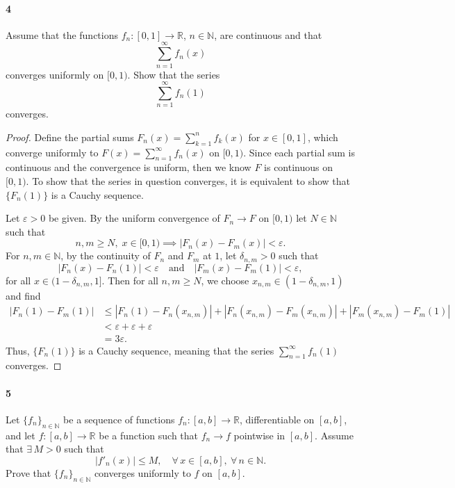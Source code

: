 \documentclass[12pt]{article}
\newenvironment{fullbox}{\begin{lrbox}{\savefullbox}\begin{minipage}{\dimexpr\textwidth-2\fboxsep\relax}}{\end{minipage}\end{lrbox}\begin{center}\framebox[\textwidth]{\usebox{\savefullbox}}\end{center}}
\newenvironment{pbox}[1][]{\begin{fullbox}\ifx#1\empty\else\paragraph{#1}\fi}{\end{fullbox}}
\theoremstyle{definition}
\newcommand{\isp}[1]{\quad\text{#1}\quad}
\newcommand{\N}{\mathbb{N}}
\newcommand{\R}{\mathbb{R}}
\newcommand{\eps}{\varepsilon}
\begin{document}
\newpage
\begin{pbox}[4]
    Assume that the functions $f_n:[0,1]\to \R$, $n\in \N$, are continuous and that 
    \begin{equation}
    \sum_{n=1}^\infty f_n(x)
    \end{equation}
    converges uniformly on $[0,1)$. Show that the series 
    \begin{equation}
    \sum_{n=1}^\infty f_n(1)
    \end{equation}
    converges.
\end{pbox}

\begin{proof}
    Define the partial sums $F_n(x) = \sum_{k=1}^{n} f_k(x)$ for $x \in [0, 1]$, which converge uniformly to $F(x) = \sum_{n=1}^{\infty} f_n(x)$ on $[0, 1)$. Since each partial sum is continuous and the convergence is uniform, then we know $F$ is continuous on $[0, 1)$. To show that the series in question converges, it is equivalent to show that $\{F_n(1)\}$ is a Cauchy sequence.
    
    Let $\eps > 0$ be given. By the uniform convergence of $F_n \to F$ on $[0, 1)$ let $N \in \N$ such that
    \[
        n, m \geq N,\; x \in [0, 1) \implies |F_n(x) - F_m(x)| < \eps.
    \]
    For $n, m \in \N$, by the continuity of $F_n$ and $F_m$ at $1$, let $\delta_{n,m} > 0$ such that
    \[
        |F_n(x) - F_n(1)| < \eps \isp{and} |F_m(x) - F_m(1)| < \eps,
    \]
    for all $x \in (1 - \delta_{n,m}, 1]$. Then for all $n, m \geq N$, we choose $x_{n,m} \in (1 - \delta_{n,m}, 1)$ and find
    \begin{align*}
        |F_n(1) - F_m(1)|
            &\leq |F_n(1) - F_n(x_{n,m})| + |F_n(x_{n,m}) - F_m(x_{n,m})| + |F_m(x_{n,m}) - F_m(1)| \\
            &< \eps + \eps + \eps \\
            &= 3\eps.
    \end{align*}
    Thus, $\{F_n(1)\}$ is a Cauchy sequence, meaning that the series $\sum_{n=1}^{\infty} f_n(1)$ converges.
    
    
\end{proof}



\newpage
\begin{pbox}[5]
    Let $\{f_n\}_{n\in \N}$ be a sequence of functions $f_n:[a,b]\to \R$, differentiable  on $[a,b]$, and let $f:[a,b]\to \R$ be a function such that $f_n \to f$ pointwise in $[a,b]$. Assume that $\exists\,M>0$ such that 
    \begin{equation}
    |f'_n(x)|\le M,\quad \forall\,x\in [a,b],\ \forall\,n\in \N.
    \end{equation}
    Prove that $\{f_n\}_{n\in \N}$ converges uniformly to $f$ on $[a,b]$.
\end{pbox}
\end{document}

